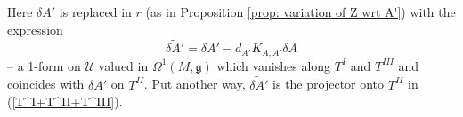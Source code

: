 \documentclass[11pt,a4paper]{amsart}
\theoremstyle{plain} %
\theoremstyle{definition}
\theoremstyle{remark}
\newcommand{\g}{\mathfrak{g}}
\newcommand{\mr}{\mathrm}
\newcommand{\sfa}{\mathsf{a}}
\newcommand{\wh}{\widehat}
\newcommand{\til}{\widetilde}
\newcommand{\mc}{\mathcal}
\begin{document}
{%
Here $\delta A'$ is replaced in %
$r$ (as in Proposition \ref{prop: variation of Z wrt A'})  with the expression
\begin{equation}\label{tilde delta A'}
\til{\delta A'}=\delta A'-d_{A'}K_{A,A'}\delta A     
\end{equation} 
-- %
a 1-form on $\mc{U}$ valued in $\Omega^1(M,\g)$ which vanishes along $T^I$ and $T^{III}$ and coincides with $\delta A'$ on $T^{II}$. Put another way, $\til{\delta A'}$ is the projector onto $T^{II}$ in (\ref{T^I+T^II+T^III}).




}
\end{document}
